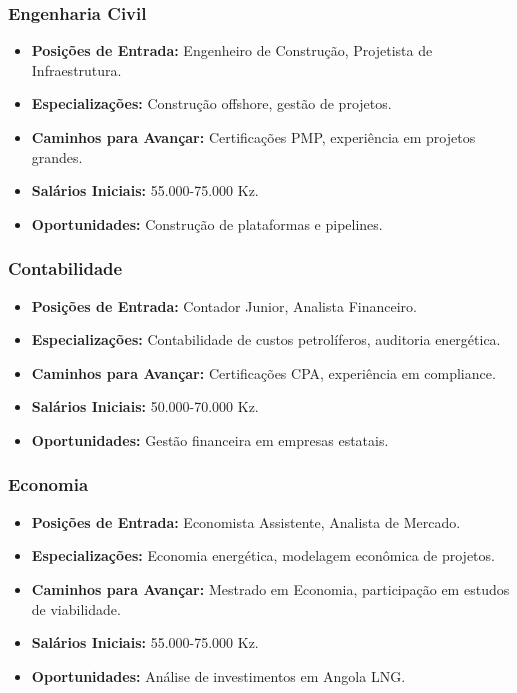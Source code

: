 \documentclass[12pt]{article}
\begin{document}
\subsubsection{Engenharia Civil}
\begin{itemize}
    \item \textbf{Posições de Entrada:} Engenheiro de Construção, Projetista de Infraestrutura.
    \item \textbf{Especializações:} Construção offshore, gestão de projetos.
    \item \textbf{Caminhos para Avançar:} Certificações PMP, experiência em projetos grandes.
    \item \textbf{Salários Iniciais:} 55.000-75.000 Kz.
    \item \textbf{Oportunidades:} Construção de plataformas e pipelines.
\end{itemize}

\subsubsection{Contabilidade}
\begin{itemize}
    \item \textbf{Posições de Entrada:} Contador Junior, Analista Financeiro.
    \item \textbf{Especializações:} Contabilidade de custos petrolíferos, auditoria energética.
    \item \textbf{Caminhos para Avançar:} Certificações CPA, experiência em compliance.
    \item \textbf{Salários Iniciais:} 50.000-70.000 Kz.
    \item \textbf{Oportunidades:} Gestão financeira em empresas estatais.
\end{itemize}

\subsubsection{Economia}
\begin{itemize}
    \item \textbf{Posições de Entrada:} Economista Assistente, Analista de Mercado.
    \item \textbf{Especializações:} Economia energética, modelagem econômica de projetos.
    \item \textbf{Caminhos para Avançar:} Mestrado em Economia, participação em estudos de viabilidade.
    \item \textbf{Salários Iniciais:} 55.000-75.000 Kz.
    \item \textbf{Oportunidades:} Análise de investimentos em Angola LNG.
\end{itemize}
\end{document}
